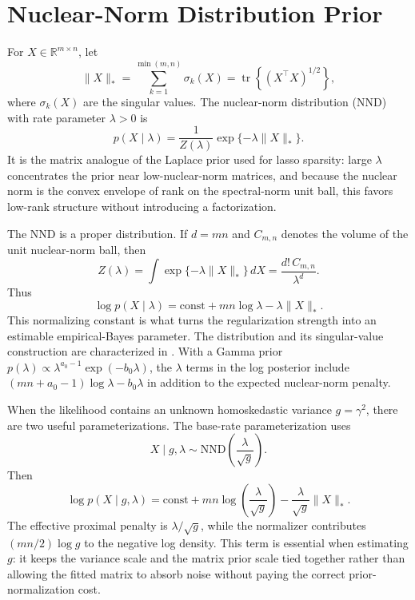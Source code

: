 \documentclass[11pt]{article}
\begin{document}
\section{Nuclear-Norm Distribution Prior}

For $X\in\mathbb{R}^{m\times n}$, let
\begin{equation}
    \|X\|_*
    =
    \sum_{k=1}^{\min(m,n)} \sigma_k(X)
    =
    \operatorname{tr}\!\left\{(X^\top X)^{1/2}\right\},
\end{equation}
where $\sigma_k(X)$ are the singular values.  The nuclear-norm distribution
(NND) with rate parameter $\lambda>0$ is
\begin{equation}
    p(X\mid\lambda)
    =
    \frac{1}{Z(\lambda)}
    \exp\{-\lambda\|X\|_*\}.
    \label{eq:nnd-density}
\end{equation}
It is the matrix analogue of the Laplace prior used for lasso sparsity:
large $\lambda$ concentrates the prior near low-nuclear-norm matrices, and
because the nuclear norm is the convex envelope of rank on the spectral-norm
unit ball, this favors low-rank structure without introducing a factorization.

The NND is a proper distribution.  If $d=mn$ and $C_{m,n}$ denotes the volume of
the unit nuclear-norm ball, then
\begin{equation}
    Z(\lambda)
    =
    \int \exp\{-\lambda\|X\|_*\}\,dX
    =
    \frac{d!\,C_{m,n}}{\lambda^d}.
    \label{eq:nnd-normalizer}
\end{equation}
Thus
\begin{equation}
    \log p(X\mid\lambda)
    =
    \mathrm{const}
    +
    mn\log\lambda
    -
    \lambda\|X\|_*.
    \label{eq:nnd-log-density}
\end{equation}
This normalizing constant is what turns the regularization strength into an
estimable empirical-Bayes parameter.  The distribution and its singular-value
construction are characterized in \citet{Segert2025-rk}.  With a Gamma prior
$p(\lambda)\propto\lambda^{a_0-1}\exp(-b_0\lambda)$, the $\lambda$ terms in the
log posterior include $(mn+a_0-1)\log\lambda-b_0\lambda$ in addition to the
expected nuclear-norm penalty.

When the likelihood contains an unknown homoskedastic variance $g=\gamma^2$,
there are two useful parameterizations.  The base-rate parameterization uses
\begin{equation}
    X\mid g,\lambda
    \sim
    \mathrm{NND}\!\left(\frac{\lambda}{\sqrt{g}}\right).
    \label{eq:scaled-nnd}
\end{equation}
Then
\begin{equation}
    \log p(X\mid g,\lambda)
    =
    \mathrm{const}
    +
    mn\log\!\left(\frac{\lambda}{\sqrt{g}}\right)
    -
    \frac{\lambda}{\sqrt{g}}\|X\|_*.
    \label{eq:scaled-nnd-log-density}
\end{equation}
The effective proximal penalty is $\lambda/\sqrt{g}$, while the normalizer
contributes $(mn/2)\log g$ to the negative log density.  This term is essential
when estimating $g$: it keeps the variance scale and the matrix prior scale tied
together rather than allowing the fitted matrix to absorb noise without paying
the correct prior-normalization cost.
\end{document}
